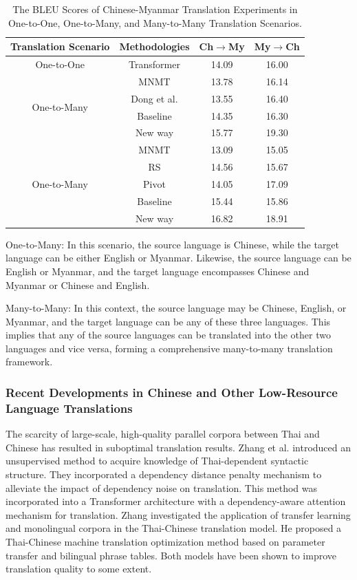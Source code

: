 \documentclass[acmsmall]{acmart}
\begin{document}
\begin{table}
\centering
\caption{The BLEU Scores of Chinese-Myanmar Translation Experiments in One-to-One, One-to-Many, and Many-to-Many Translation Scenarios.}
\label{Mao}
\begin{tabular}{cccc}
\toprule
Translation Scenario & Methodologies & Ch$\rightarrow$My & My$\rightarrow$Ch \\
\midrule
One-to-One
 & Transformer & 14.09 & 16.00 \\
\midrule
\multirow{4}{*}{One-to-Many} %
 & MNMT & 13.78 & 16.14 \\
 & Dong et al. & 13.55 & 16.40 \\
 & Baseline & 14.35 & 16.30 \\
 & New way & 15.77 & 19.30 \\
\midrule
\multirow{5}{*}{One-to-Many} %
 & MNMT & 13.09 & 15.05 \\
 & RS & 14.56 & 15.67 \\
 & Pivot & 14.05 & 17.09 \\
 & Baseline & 15.44 & 15.86 \\
 & New way & 16.82 & 18.91 \\
\bottomrule
\end{tabular}
\end{table}

One-to-Many: In this scenario, the source language is Chinese, while the target language can be either English or Myanmar. Likewise, the source language can be English or Myanmar, and the target language encompasses Chinese and Myanmar or Chinese and English.

Many-to-Many: In this context, the source language may be Chinese, English, or Myanmar, and the target language can be any of these three languages. This implies that any of the source languages can be translated into the other two languages and vice versa, forming a comprehensive many-to-many translation framework.


\subsubsection{Recent Developments in Chinese and Other Low-Resource Language Translations}


The scarcity of large-scale, high-quality parallel corpora between Thai and Chinese has resulted in suboptimal translation results. Zhang et al. \cite{4-2-28} introduced an unsupervised method to acquire knowledge of Thai-dependent syntactic structure. They incorporated a dependency distance penalty mechanism to alleviate the impact of dependency noise on translation. This method was incorporated into a Transformer architecture with a dependency-aware attention mechanism for translation. Zhang \cite{4-2-29} investigated the application of transfer learning and monolingual corpora in the Thai-Chinese translation model. He proposed a Thai-Chinese machine translation optimization method based on parameter transfer and bilingual phrase tables. Both models have been shown to improve translation quality to some extent.
\end{document}
